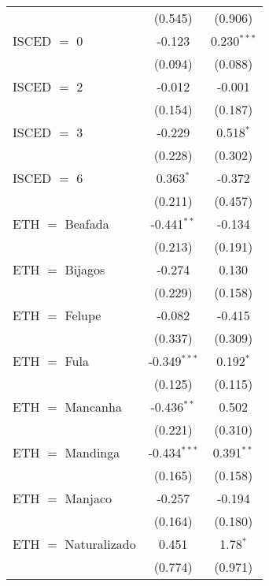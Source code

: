 \begin{table}[htbp!]
\begin{adjustbox}{width = 1\textwidth, max height = 0.95\textheight, center}
\begin{threeparttable}[b]
\begin{tabular}{lcc}
                                 & (0.545)        & (0.906)\\   
            ISCED $=$ 0          & -0.123         & 0.230$^{***}$\\   
                                 & (0.094)        & (0.088)\\   
            ISCED $=$ 2          & -0.012         & -0.001\\   
                                 & (0.154)        & (0.187)\\   
            ISCED $=$ 3          & -0.229         & 0.518$^{*}$\\   
                                 & (0.228)        & (0.302)\\   
            ISCED $=$ 6          & 0.363$^{*}$    & -0.372\\   
                                 & (0.211)        & (0.457)\\   
            ETH $=$ Beafada      & -0.441$^{**}$  & -0.134\\   
                                 & (0.213)        & (0.191)\\   
            ETH $=$ Bijagos      & -0.274         & 0.130\\   
                                 & (0.229)        & (0.158)\\   
            ETH $=$ Felupe       & -0.082         & -0.415\\   
                                 & (0.337)        & (0.309)\\   
            ETH $=$ Fula         & -0.349$^{***}$ & 0.192$^{*}$\\   
                                 & (0.125)        & (0.115)\\   
            ETH $=$ Mancanha     & -0.436$^{**}$  & 0.502\\   
                                 & (0.221)        & (0.310)\\   
            ETH $=$ Mandinga     & -0.434$^{***}$ & 0.391$^{**}$\\   
                                 & (0.165)        & (0.158)\\   
            ETH $=$ Manjaco      & -0.257         & -0.194\\   
                                 & (0.164)        & (0.180)\\   
            ETH $=$ Naturalizado & 0.451          & 1.78$^{*}$\\   
                                 & (0.774)        & (0.971)\\   

\end{tabular}
\end{threeparttable}
\end{adjustbox}
\end{table}
